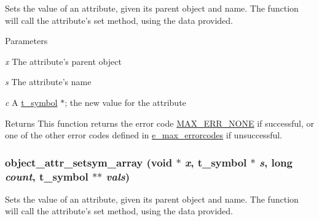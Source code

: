 Sets the value of an attribute, given its parent object and name. The function will call the attribute's {\ttfamily set} method, using the data provided.


\begin{DoxyParams}{Parameters}
\item[{\em x}]The attribute's parent object \item[{\em s}]The attribute's name \item[{\em c}]A \hyperlink{structt__symbol}{t\_\-symbol} $\ast$; the new value for the attribute\end{DoxyParams}
\begin{DoxyReturn}{Returns}
This function returns the error code \hyperlink{group__misc_gga0764dd6c02b76cca7d053ae50555d69da6d22f77fef8b1e1b074cef5d29d935fd}{MAX\_\-ERR\_\-NONE} if successful, or one of the other error codes defined in \hyperlink{group__misc_ga0764dd6c02b76cca7d053ae50555d69d}{e\_\-max\_\-errorcodes} if unsuccessful. 
\end{DoxyReturn}
\hypertarget{group__attr_gaa96477728381a2e23b34a56ae2c6b9ce}{
\subsubsection[{object\_\-attr\_\-setsym\_\-array}]{ object\_\-attr\_\-setsym\_\-array (void $\ast$ {\em x}, \/  {\bf t\_\-symbol} $\ast$ {\em s}, \/  long {\em count}, \/  {\bf t\_\-symbol} $\ast$$\ast$ {\em vals})}}
\label{group__attr_gaa96477728381a2e23b34a56ae2c6b9ce}


Sets the value of an attribute, given its parent object and name. The function will call the attribute's {\ttfamily set} method, using the data provided.


